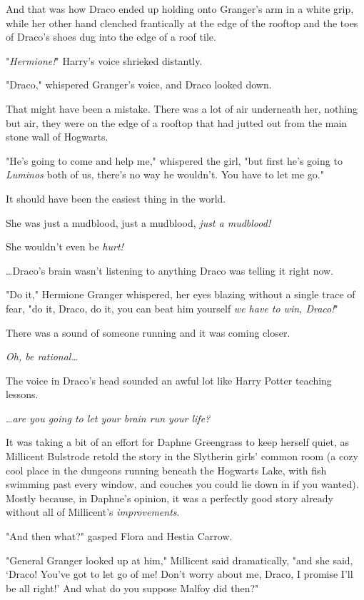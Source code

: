 And that was how Draco ended up holding onto Granger's arm in a white grip,
while her other hand clenched frantically at the edge of the rooftop and the
toes of Draco's shoes dug into the edge of a roof tile.

"\emph{Hermione!}" Harry's voice shrieked distantly.

"Draco," whispered Granger's voice, and Draco looked down.

That might have been a mistake. There was a lot of air underneath her, nothing
but air, they were on the edge of a rooftop that had jutted out from the main
stone wall of Hogwarts.

"He's going to come and help me," whispered the girl, "but first he's going to
\emph{Luminos} both of us, there's no way he wouldn't. You have to let me go."

It should have been the easiest thing in the world.

She was just a mudblood, just a mudblood, \emph{just a mudblood!}

She wouldn't even be \emph{hurt!}

…Draco's brain wasn't listening to anything Draco was telling it right
now.

"Do it," Hermione Granger whispered, her eyes blazing without a single trace of
fear, "do it, Draco, do it, you can beat him yourself \emph{we have to win,
Draco!}"

There was a sound of someone running and it was coming closer.

\emph{Oh, be rational…}

The voice in Draco's head sounded an awful lot like Harry Potter teaching
lessons.

…\emph{are you going to let your brain run your life?}

It was taking a bit of an effort for Daphne Greengrass to keep herself quiet,
as Millicent Bulstrode retold the story in the Slytherin girls' common room (a
cozy cool place in the dungeons running beneath the Hogwarts Lake, with fish
swimming past every window, and couches you could lie down in if you wanted).
Mostly because, in Daphne's opinion, it was a perfectly good story already
without all of Millicent's \emph{improvements}.

"And then what?" gasped Flora and Hestia Carrow.

"General Granger looked up at him," Millicent said dramatically, "and she said,
`Draco! You've got to let go of me! Don't worry about me, Draco, I promise I'll
be all right!' And what do you suppose Malfoy did then?"

